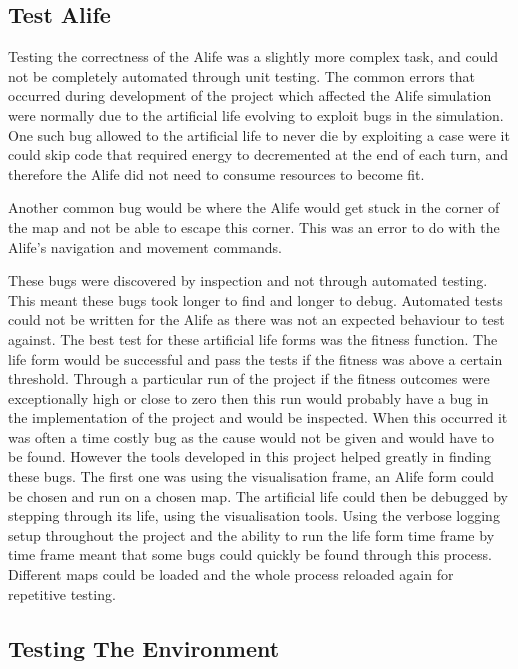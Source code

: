 \documentclass[12pt]{article}
\begin{document}
\subsection{Test Alife}

Testing the correctness of the Alife was a slightly more complex task, and could not be completely automated through unit testing.
The common errors that occurred during development of the project which affected the Alife simulation were normally due to the
artificial life evolving to exploit bugs in the simulation. One such bug allowed to the artificial life to never die by exploiting
a case were it could skip code that required energy to decremented at the end of each turn, and therefore the Alife did not need
to consume resources to become fit.

Another common bug would be where the Alife would get stuck in the corner of the map and not be able to escape this corner. This
was an error to do with the Alife's navigation and movement commands.

These bugs were discovered by inspection and not through automated testing. This meant these bugs took longer to find and longer to
debug. Automated tests could not be written for the Alife as there was not an expected behaviour to test against. The best
test for these artificial life forms was the fitness function. The life form would be successful and pass the tests if the fitness
was above a certain threshold. Through a particular run of the project if the fitness outcomes were exceptionally high or close to 
zero then this run would probably have a bug in the implementation of the project and would be inspected. When this occurred
it was often a time costly bug as the cause would not be given and would have to be found. However the tools developed in this
project helped greatly in finding these bugs. The first one was using the visualisation frame, an Alife form could be chosen
and run on a chosen map. The artificial life could then be debugged by stepping through its life, using the visualisation tools.
Using the verbose logging setup throughout the project and the ability to run the life form time frame by time frame meant that
some bugs could quickly be found through this process. Different maps could be loaded and the whole process reloaded again for
repetitive testing. 


\subsection{Testing The Environment}
\end{document}
